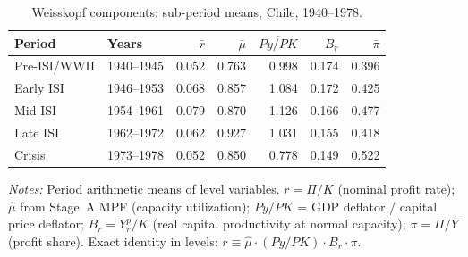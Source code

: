 \begin{table}[htbp]
\centering
\small
\caption{Weisskopf components: sub-period means, Chile, 1940--1978.}
\label{tab:B4_subperiod_CL}
\begin{threeparttable}
\begin{tabular}{llrrrrr}
\toprule
Period & Years & $\bar{r}$ & $\bar{\mu}$ & $\overline{Py/PK}$ & $\bar{B}_{r}$ & $\bar{\pi}$ \\
\midrule
Pre-ISI/WWII & 1940--1945 & 0.052 & 0.763 & 0.998 & 0.174 & 0.396 \\
\midrule
Early ISI & 1946--1953 & 0.068 & 0.857 & 1.084 & 0.172 & 0.425 \\
Mid ISI & 1954--1961 & 0.079 & 0.870 & 1.126 & 0.166 & 0.477 \\
Late ISI & 1962--1972 & 0.062 & 0.927 & 1.031 & 0.155 & 0.418 \\
\midrule
Crisis & 1973--1978 & 0.052 & 0.850 & 0.778 & 0.149 & 0.522 \\
\bottomrule
\end{tabular}
\begin{tablenotes}
\small
\item \textit{Notes:}
  Period arithmetic means of level variables.
  $r = \Pi/K$ (nominal profit rate);
  $\hat{\mu}$ from Stage~A MPF (capacity utilization);
  $Py/PK$ = GDP deflator / capital price deflator;
  $B_{r} = Y^{p}_{r}/K$ (real capital productivity at normal capacity);
  $\pi = \Pi/Y$ (profit share).
  Exact identity in levels: $r \equiv \hat{\mu} \cdot (Py/PK) \cdot B_{r} \cdot \pi$.
\end{tablenotes}
\end{threeparttable}
\end{table}
